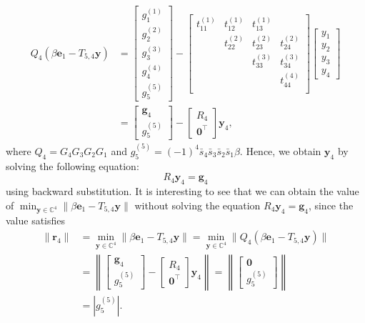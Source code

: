 \[\begin{aligned}
Q_4(\beta\bm e_1-T_{5,4}\bm y)&=\begin{bmatrix}g_1^{(1)}\\g_2^{(2)}\\g_3^{(3)}\\g_4^{(4)}\\g_5^{(5)}\end{bmatrix}
-\begin{bmatrix}t_{11}^{(1)}&t_{12}^{(1)}&t_{13}^{(1)}&\\&t_{22}^{(2)}&t_{23}^{(2)}&t_{24}^{(2)}\\&&t_{33}^{(3)}&t_{34}^{(3)}\\&&&t_{44}^{(4)}\\&&&\end{bmatrix}\begin{bmatrix}y_1\\y_2\\y_3\\y_4\end{bmatrix}\\
&=\begin{bmatrix}\bm g_4\\g_5^{(5)}\end{bmatrix}-\begin{bmatrix}R_4\\\bm0^{\top}\end{bmatrix}\bm y_4,
\end{aligned}\]
{where $Q_4=G_4G_3G_2G_1$ and $g_5^{(5)}=(-1)^4\bar s_4\bar s_3\bar s_2\bar s_1\beta$. Hence, we obtain $\bm y_4$ by solving the following equation:}
\begin{equation}\label{eq:minres-upper-triangular-system}R_4\bm y_4=\bm g_4\end{equation}
{using backward substitution. It is interesting to see that we can obtain the value of $\min_{\bm y\in\mathbb C^4}\|\beta\bm e_1-T_{5,4}\bm y\|$ without solving the equation $R_4\bm y_4=\bm g_4$, since the value satisfies}
\[\begin{aligned}
\|\bm r_4\|&=\min_{\bm y\in\mathbb C^4}\|\beta\bm e_1-T_{5,4}\bm y\|
=\min_{\bm y\in\mathbb C^4}\|Q_4(\beta\bm e_1-T_{5,4}\bm y)\|\\
&=\left\|\begin{bmatrix}\bm g_4\\g_5^{(5)}\end{bmatrix}-\begin{bmatrix}R_4\\\bm0^{\top}\end{bmatrix}\bm y_4\right\|
=\left\|\begin{bmatrix}\bm0\\g_5^{(5)}\end{bmatrix}\right\|\\
&=|g_5^{(5)}|.
\end{aligned}\]
